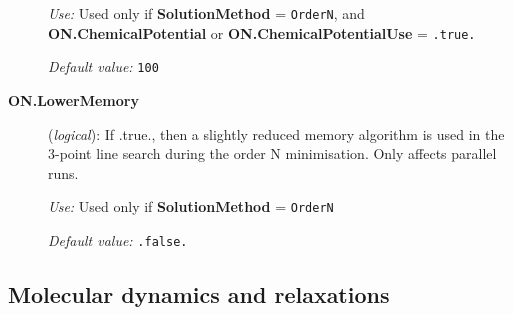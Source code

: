 \documentclass[11pt]{article}
\begin{document}
\begin{description}
{\it Use:} Used only if {\bf SolutionMethod} = {\tt OrderN},
and {\bf ON.ChemicalPotential} or  {\bf ON.ChemicalPotentialUse} = 
{\tt .true.}

{\it Default value:} {\tt 100}

\item[{\bf ON.LowerMemory}] ({\it logical}): 
If .true., then a slightly reduced memory algorithm is used in the 
3-point line search during the order N minimisation. Only affects
parallel runs.

{\it Use:} Used only if  {\bf SolutionMethod} = {\tt OrderN}

{\it Default value:} {\tt .false.}
        
\end{description}



\vspace{5pt}
\subsection{Molecular dynamics and relaxations}
\end{document}
